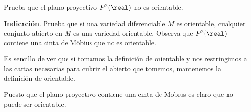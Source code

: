 \begin{problem}[10]
Prueba que el plano proyectivo $P^2(\real)$ no es orientable.

\textbf{Indicación}. Prueba que si una variedad diferenciable $M$ es orientable, cualquier conjunto abierto en $M$ es una variedad orientable. Observa que $P^2(\real)$ contiene una cinta de Möbius que no es orientable.

\solution


Es sencillo de ver que si tomamos la definición de orientable y nos restringimos a las cartas necesarias para cubrir el abierto que tomemos, mantenemos la definición de orientable.

Puesto que el plano proyectivo contiene una cinta de Möbius es claro que no puede ser orientable.

\end{problem}


